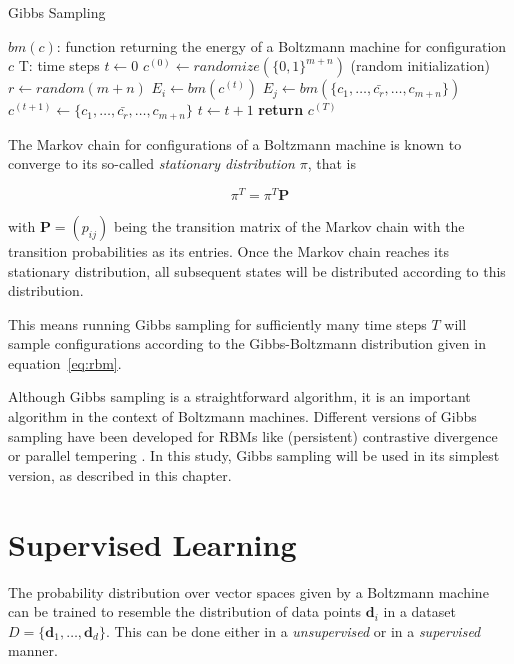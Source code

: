 \begin{algorithm}[H]
    \label{alg:gibbs}
    \caption{Gibbs Sampling}\label{euclid}
    \begin{algorithmic}[1]
        \Require $bm(c)$: function returning the energy of a Boltzmann machine for configuration $c$
        \Require T: time steps
        \State $t\gets 0$
        \State $c^{(0)} \gets randomize(\{0,1\}^{m+n})$ (random initialization)
        \Repeat
            \State $r \gets random(m+n)$
            \State $E_i \gets bm(c^{(t)})$
            \State $E_j \gets bm(\{c_1,\dots,\bar{c_r},\dots,c_{m+n}\})$
                \State $c^{(t+1)} \gets \{c_1,\dots,\bar{c_r},\dots,c_{m+n}\}$
            \EndIf
            \State $t\gets t+1$
        \State \textbf{return} $c^{(T)}$
    \end{algorithmic}
\end{algorithm}

The Markov chain for configurations of a Boltzmann machine is known to converge to its so-called 
\textit{stationary distribution} $\pi$, that is

\begin{equation}
    \pi^T=\pi^T\bm{P}
\end{equation}

with $\bm{P} = (p_{ij})$ being the transition matrix of the Markov chain with the transition probabilities as its entries.
Once the Markov chain reaches its stationary distribution, all subsequent states will be distributed according to this distribution.

This means running Gibbs sampling for 
sufficiently many time steps $T$ will sample configurations according 
to the Gibbs-Boltzmann distribution given in equation~\ref{eq:rbm}.

Although Gibbs sampling is a straightforward algorithm, it is an important algorithm in the context of 
Boltzmann machines. Different versions of Gibbs sampling have been developed for RBMs like 
(persistent) contrastive divergence \cite{hinton2002training, tieleman2008training} or parallel tempering \cite{desjardins2010parallel}. In this study,
Gibbs sampling will be used in its simplest version, as described in this chapter.
    
\section{Supervised Learning}
\label{sec:learning}
The probability distribution over vector spaces given by a Boltzmann machine can be trained to 
resemble the distribution of data points $\bm{d}_i$ in a dataset $D=\{\bm{d}_1,\dots,\bm{d}_d\}$. This can be done either in a \textit{unsupervised}
or in a \textit{supervised} manner.

